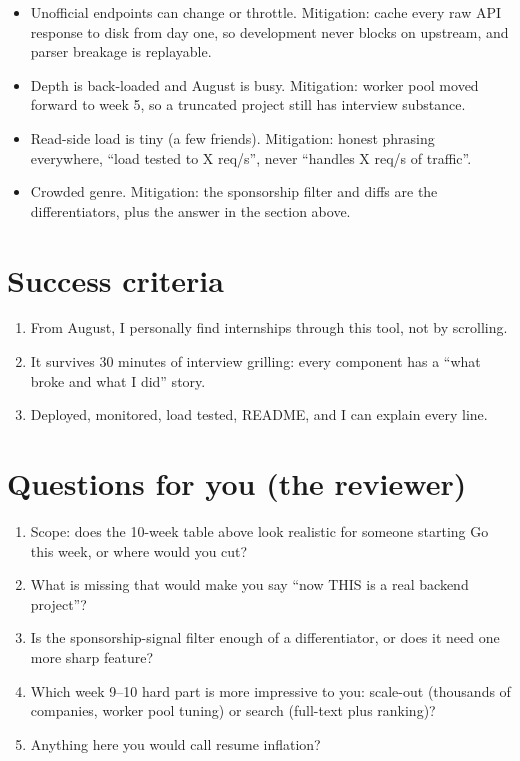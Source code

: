 \documentclass[11pt]{article}
\begin{document}
\begin{itemize}
  \item Unofficial endpoints can change or throttle. Mitigation: cache every raw API response to disk from day one, so development never blocks on upstream, and parser breakage is replayable.
  \item Depth is back-loaded and August is busy. Mitigation: worker pool moved forward to week 5, so a truncated project still has interview substance.
  \item Read-side load is tiny (a few friends). Mitigation: honest phrasing everywhere, ``load tested to X req/s'', never ``handles X req/s of traffic''.
  \item Crowded genre. Mitigation: the sponsorship filter and diffs are the differentiators, plus the answer in the section above.
\end{itemize}

\section*{Success criteria}

\begin{enumerate}
  \item From August, I personally find internships through this tool, not by scrolling.
  \item It survives 30 minutes of interview grilling: every component has a ``what broke and what I did'' story.
  \item Deployed, monitored, load tested, README, and I can explain every line.
\end{enumerate}

\section*{Questions for you (the reviewer)}

\begin{enumerate}
  \item Scope: does the 10-week table above look realistic for someone starting Go this week, or where would you cut?
  \item What is missing that would make you say ``now THIS is a real backend project''?
  \item Is the sponsorship-signal filter enough of a differentiator, or does it need one more sharp feature?
  \item Which week 9--10 hard part is more impressive to you: scale-out (thousands of companies, worker pool tuning) or search (full-text plus ranking)?
  \item Anything here you would call resume inflation?
\end{enumerate}
\end{document}
